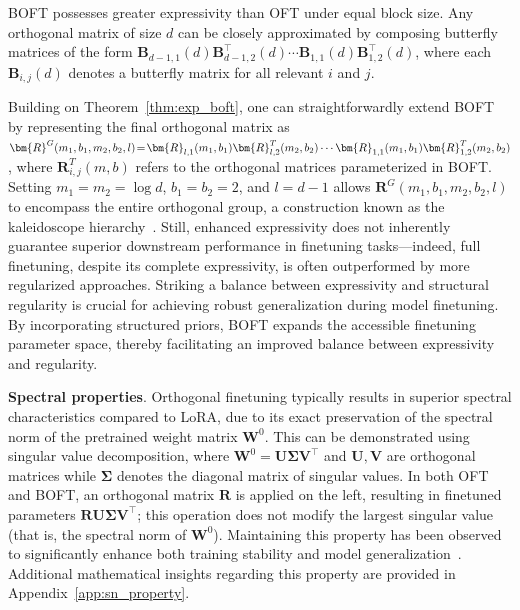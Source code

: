 \begin{theorem}\label{thm:exp_boft}
    BOFT possesses greater expressivity than OFT under equal block size. Any orthogonal matrix of size $d$ can be closely approximated by composing butterfly matrices of the form $\bm{B}_{d-1,1}(d)\bm{B}^\top_{d-1,2}(d)\cdots\bm{B}_{1,1}(d)\bm{B}^\top_{1,2}(d)$, where each $\bm{B}_{i,j}(d)$ denotes a butterfly matrix for all relevant $i$ and $j$.
\end{theorem}

Building on Theorem~\ref{thm:exp_boft}, one can straightforwardly extend BOFT by representing the final orthogonal matrix as $\thickmuskip=2mu \medmuskip=2mu \bm{R}^G(m_1,b_1,m_2,b_2,l)=\bm{R}_{l,1}(m_1,b_1)\bm{R}_{l,2}^T(m_2,b_2)\cdots\bm{R}_{1,1}(m_1,b_1)\bm{R}_{1,2}^T(m_2,b_2)$, where $\bm{R}_{i,j}^T(m,b)$ refers to the orthogonal matrices parameterized in BOFT. Setting $m_1=m_2=\log d$, $b_1=b_2=2$, and $l=d-1$ allows $\bm{R}^G(m_1,b_1,m_2,b_2,l)$ to encompass the entire orthogonal group, a construction known as the kaleidoscope hierarchy~\cite{dao2019kaleidoscope}. Still, enhanced expressivity does not inherently guarantee superior downstream performance in finetuning tasks—indeed, full finetuning, despite its complete expressivity, is often outperformed by more regularized approaches. Striking a balance between expressivity and structural regularity is crucial for achieving robust generalization during model finetuning. By incorporating structured priors, BOFT expands the accessible finetuning parameter space, thereby facilitating an improved balance between expressivity and regularity.

\textbf{Spectral properties}. Orthogonal finetuning typically results in superior spectral characteristics compared to LoRA, due to its exact preservation of the spectral norm of the pretrained weight matrix $\bm{W}^0$. This can be demonstrated using singular value decomposition, where $\bm{W}^0=\bm{U}\bm{\Sigma}\bm{V}^\top$ and $\bm{U},\bm{V}$ are orthogonal matrices while $\bm{\Sigma}$ denotes the diagonal matrix of singular values. In both OFT and BOFT, an orthogonal matrix $\bm{R}$ is applied on the left, resulting in finetuned parameters $\bm{R}\bm{U}\bm{\Sigma}\bm{V}^\top$; this operation does not modify the largest singular value (that is, the spectral norm of $\bm{W}^0$). Maintaining this property has been observed to significantly enhance both training stability and model generalization~\cite{miyato2018spectral,yoshida2017spectral}. Additional mathematical insights regarding this property are provided in Appendix~\ref{app:sn_property}.

